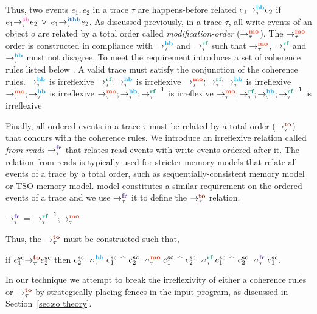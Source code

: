 Thus, two events $e_1,e_2$ in a trace $\tau$ are happens-before 
related \ie
$\hb{\tau}{e_1}{e_2}$ if $\seqb{\tau}{e_1}{e_2}$ $\vee$ 
$\ithb{\tau}{e_1}{e_2}$.
%
As discussed previously, in a trace $\tau$, all write events of 
an object $o$ are related by a total order called 
{\em modification-order} ($\setMO$).
%
The $\setMO$ order is constructed in compliance with $\setHB$ and 
$\setRF$ such that $\setMO$, $\setRF$ and $\setHB$ must not 
disagree.
%
To meet the requirement \cc introduces a set of
coherence rules listed below \cite{LahavVafeiadis-PLDI17}.
A valid \cc trace must satisfy the conjunction
of the coherence rules.
%
\newline $\setHB$ is irreflexive
\newline $\setRF;\setHB$ is irreflexive
\newline $\setMO;\setRF;\setHB$ is irreflexive
\newline $\setMO;\setHB$ is irreflexive
\newline $\setMO;\setHB;\setRF^{-1}$ is irreflexive
\newline $\setMO;\setRF;\setHB;\setRF^{-1}$ is irreflexive

Finally, all \sc ordered events in a trace $\tau$ must be related
by a total order ($\setTO$) that concurs with the coherence rules.
%
We introduce an irreflexive relation called {\em from-reads} $\setFR$ 
that relates read events with write events ordered after it.
%
The relation from-reads is typically used for stricter memory models 
that relate all events of a trace by a total order,
such as sequentially-consistent memory model or TSO memory model.
\cc model constitutes a similar requirement on the \sc ordered
events of a trace and we use $\setFR$ it to define the $\setTO$
relation.
%
\begin{definition}
	$\setFR$ = $\setRF^{-1}$;$\setMO$
\end{definition}
%
Thus, the $\setTO$ must be constructed such that,

if 
$\to{\tau}{e^\sc_1}{e^\sc_2}$ then 
$\nhb{\tau}{e^\sc_2}{e^\sc_1}$ $\^$
$\nmo{\tau}{e^\sc_2}{e^\sc_1}$ $\^$
$\nrf{\tau}{e^\sc_2}{e^\sc_1}$ $\^$
$\nfr{\tau}{e^\sc_2}{e^\sc_1}$.

\noindent
In our technique we attempt to break the irreflexivity of either
a coherence rules or $\setTO$ by strategically placing \cc fences in 
the input program, as discussed in Section~\ref{sec:so theory}.

